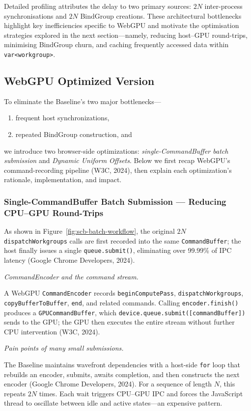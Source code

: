 \documentclass[PhD]{PHlab-thesis}
\begin{document}
Detailed profiling attributes the delay to two primary sources: $2N$ inter-process synchronisations and $2N$ BindGroup creations. These architectural bottlenecks highlight key inefficiencies specific to WebGPU and motivate the optimisation strategies explored in the next section—namely, reducing host–GPU round-trips, minimising BindGroup churn, and caching frequently accessed data within \texttt{var<workgroup>}.



\subsection{WebGPU Optimized Version}
To eliminate the Baseline's two major bottlenecks—
\begin{enumerate}
    \item frequent host synchronizations,
    \item repeated BindGroup construction, and
\end{enumerate}
we introduce two browser-side optimizations: \emph{single-CommandBuffer batch submission} and \emph{Dynamic Uniform Offsets}. Below we first recap WebGPU's command-recording pipeline (W3C, 2024), then explain each optimization's rationale, implementation, and impact.

\subsubsection{Single-CommandBuffer Batch Submission — Reducing CPU–GPU Round-Trips}
As shown in Figure~\ref{fig:scb-batch-workflow}, the original $2N$ \texttt{dispatchWorkgroups} calls are first recorded into the same \texttt{CommandBuffer}; the host finally issues a single \texttt{queue.submit()}, eliminating over 99.99\% of IPC latency (Google Chrome Developers, 2024).

\textit{CommandEncoder and the command stream.}

A WebGPU \texttt{CommandEncoder} records \texttt{beginComputePass}, \texttt{dispatchWorkgroups}, \texttt{copyBufferToBuffer}, \texttt{end}, and related commands.  
Calling \texttt{encoder.finish()} produces a \texttt{GPUCommandBuffer}, which \texttt{device.queue.submit([commandBuffer])} sends to the GPU; the GPU then executes the entire stream without further CPU intervention (W3C, 2024).

\textit{Pain points of many small submissions.}

The Baseline maintains wavefront dependencies with a host-side \texttt{for} loop that rebuilds an encoder, submits, awaits completion, and then constructs the next encoder (Google Chrome Developers, 2024). For a sequence of length $N$, this repeats $2N$ times. Each wait triggers CPU–GPU IPC and forces the JavaScript thread to oscillate between idle and active states—an expensive pattern.
\end{document}

